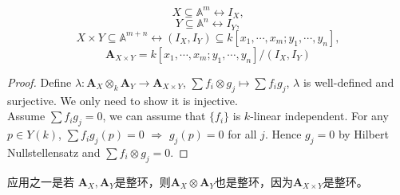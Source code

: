 \[X\subseteq \mathbb{A}^m \longleftrightarrow I_X, \]
\[Y\subseteq \mathbb{A}^n \longleftrightarrow I_Y, \]
\[X\times Y\subseteq \mathbb{A}^{m+n} \longleftrightarrow (I_X,I_Y)\subseteq k[x_1,\cdots,x_m;y_1,\cdots,y_n],\]
\[ \mathbf{A}_{X\times Y} = k[x_1,\cdots,x_m;y_1,\cdots,y_n]/(I_X,I_Y)\]
\begin{proof}
	Define $\lambda \colon \mathbf{A}_{X} \otimes_k \mathbf{A}_{Y} \longrightarrow \mathbf{A}_{X\times Y}$, $\sum f_i\otimes g_j \mapsto \sum f_ig_j$, $\lambda$ is well-defined and surjective. We only need to show it is injective.\\
	Assume $\sum f_ig_j=0$, we can assume that $\{f_i\}$ is $k$-linear independent. For any $p\in Y(k)$, $\sum f_ig_j(p)=0$ $\Rightarrow$ $g_j(p)=0$ for all $j$. Hence $g_j=0$ by Hilbert Nullstellensatz and $\sum f_i\otimes g_j =0.$
\end{proof}
应用之一是若 $\mathbf{A}_X,\mathbf{A}_Y$是整环，则$\mathbf{A}_X\otimes \mathbf{A}_Y$也是整环，因为$\mathbf{A}_{X\times Y}$是整环。
